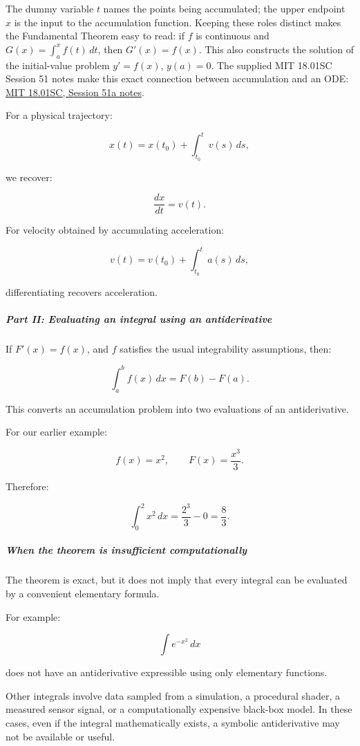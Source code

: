 The dummy variable \(t\) names the points being accumulated; the upper endpoint \(x\) is the input to the accumulation function. Keeping these roles distinct makes the Fundamental Theorem easy to read: if \(f\) is continuous and \(G(x)=\int_a^x f(t)\,dt\), then \(G'(x)=f(x)\). This also constructs the solution of the initial-value problem \(y'=f(x)\), \(y(a)=0\). The supplied MIT 18.01SC Session 51 notes make this exact connection between accumulation and an ODE: \href{https://ocw.mit.edu/courses/18-01sc-single-variable-calculus-fall-2010/2459faee7ec3308afd5cca2b95fad48e_MIT18_01SCF10_Ses51a.pdf}{MIT 18.01SC, Session 51a notes}.

For a physical trajectory:

\[
x(t)=x(t_0)+\int_{t_0}^{t}v(s)\,ds,
\]

we recover:

\[
\frac{dx}{dt}=v(t).
\]

For velocity obtained by accumulating acceleration:

\[
v(t)=v(t_0)+\int_{t_0}^{t}a(s)\,ds,
\]

differentiating recovers acceleration.

\subparagraph{Part II: Evaluating an integral using an antiderivative}\label{part-ii-evaluating-an-integral-using-an-antiderivative}

If \(F'(x)=f(x)\), and \(f\) satisfies the usual integrability assumptions, then:

\[
\boxed{\int_a^b f(x)\,dx=F(b)-F(a)}.
\]

This converts an accumulation problem into two evaluations of an antiderivative.

For our earlier example:

\[
f(x)=x^2,\qquad F(x)=\frac{x^3}{3}.
\]

Therefore:

\[
\int_0^2x^2\,dx = \frac{2^3}{3}-0 =\frac83.
\]

\subparagraph{When the theorem is insufficient computationally}\label{when-the-theorem-is-insufficient-computationally}

The theorem is exact, but it does not imply that every integral can be evaluated by a convenient elementary formula.

For example:

\[
\int e^{-x^2}\,dx
\]

does not have an antiderivative expressible using only elementary functions.

Other integrals involve data sampled from a simulation, a procedural shader, a measured sensor signal, or a computationally expensive black-box model. In these cases, even if the integral mathematically exists, a symbolic antiderivative may not be available or useful.

